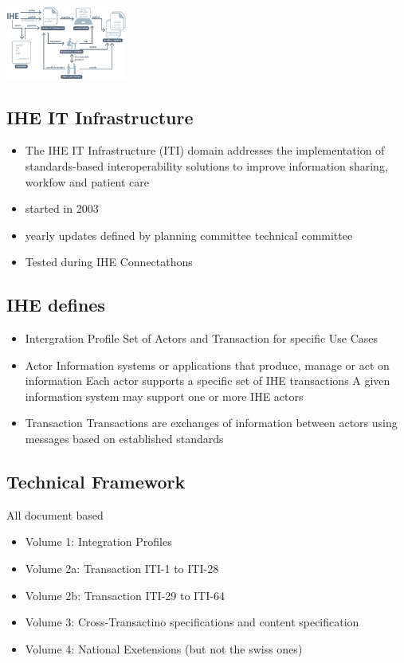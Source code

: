 \documentclass{report}
\newenvironment{Figure}
	{\par\medskip\noindent\minipage{\linewidth}}
	{\endminipage\par\medskip}
\theoremstyle{definition}
\theoremstyle{example}
\begin{document}
\begin{Figure}
   \centering
    \includegraphics[width=150px]{img/IHE.png}
        \label{fig:Descirption IHE}
\end{Figure}

\subsection{IHE IT Infrastructure}
\begin{itemize}
   \item The IHE IT Infrastructure (ITI) domain addresses the implementation of standards-based interoperability solutions to improve information sharing, workfow and patient care
   \item started in 2003
   \item yearly updates defined by
   \subitem planning committee
   \subitem technical committee
   \item Tested during IHE Connectathons 
\end{itemize}

\subsection{IHE defines}
\begin{itemize}
   \item Intergration Profile
   \subitem Set of Actors and Transaction for specific Use Cases 
   \item Actor
   \subitem Information systems or applications that produce, manage or act on information
   \subitem Each actor supports a specific set of IHE transactions
   \subitem A given information system may support one or more IHE actors
   \item Transaction
   \subitem Transactions are exchanges of information between actors using messages based on established standards 
\end{itemize}

\subsection{Technical Framework}
All document based
\begin{itemize}
   \item Volume 1: Integration Profiles
   \item Volume 2a: Transaction ITI-1 to ITI-28
   \item Volume 2b: Transaction ITI-29 to ITI-64
   \item Volume 3: Cross-Transactino specifications and content specification
   \item Volume 4: National Exetensions (but not the swiss ones)
\end{itemize}
\end{document}
